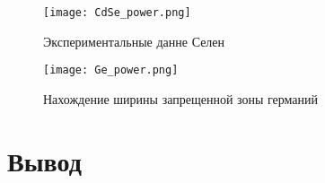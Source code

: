 \documentclass[a4paper, 14pt]{article}
\begin{document}
\begin{figure}[htbp]
    \centering
    \texttt{[image: CdSe\_power.png]}


    \caption{Экспериментальные данне Селен}
    \label{fig:pow1}
\end{figure}

\begin{figure}[htbp]
    \centering
    \texttt{[image: Ge\_power.png]}
    

    \caption{Нахождение ширины запрещенной зоны германий}
    \label{fig:pow2}
\end{figure}

\newpage
\section*{\textcolor{header}{Вывод}}
\end{document}
